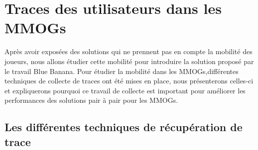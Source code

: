 \newpage
\section{Traces des utilisateurs dans les MMOGs}
	\label{trace}
 	Après avoir exposées des solutions qui ne prennent pas en compte la mobilité des joueurs, nous allons étudier cette mobilité pour introduire la solution proposé par le travail Blue Banana. Pour étudier la mobilité dans les MMOGs,différentes techniques de collecte de traces ont été mises en place, nous présenterons celles-ci et expliquerons pourquoi ce travail de collecte est important pour améliorer les performances des solutions pair à pair pour les MMOGs.
	\subsection{Les différentes techniques de récupération de trace}

